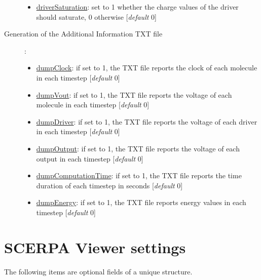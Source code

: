 \documentclass[a4paper,10pt]{article}
\begin{document}
\begin{description}
	\begin{itemize}
	\item \underline{driverSaturation}: set to 1 whether the charge values of the driver should saturate, 0 otherwise [\textit{default} 0]
	\end{itemize}
\item[Generation of the Additional Information TXT file]:
\begin{itemize}
	\item \underline{dumpClock}: if set to 1, the TXT file reports the clock of each molecule in each timestep [\textit{default} 0]
	\item \underline{dumpVout}: if set to 1, the TXT file reports the voltage of each molecule in each timestep [\textit{default} 0]
	\item \underline{dumpDriver}: if set to 1, the TXT file reports the voltage of each driver in each timestep [\textit{default} 0]
	\item \underline{dumpOutput}: if set to 1, the TXT file reports the voltage of each output in each timestep [\textit{default} 0]
	\item \underline{dumpComputationTime}: if set to 1, the TXT file reports the time duration of each timestep in seconds [\textit{default} 0]
	\item \underline{dumpEnergy}: if set to 1, the TXT file reports energy values in each timestep [\textit{default} 0]
\end{itemize}
\end{description}

\section{SCERPA Viewer settings}\label{sec:viewerSettings}
%
\noindent The following items are optional fields of a unique structure.
\end{document}
